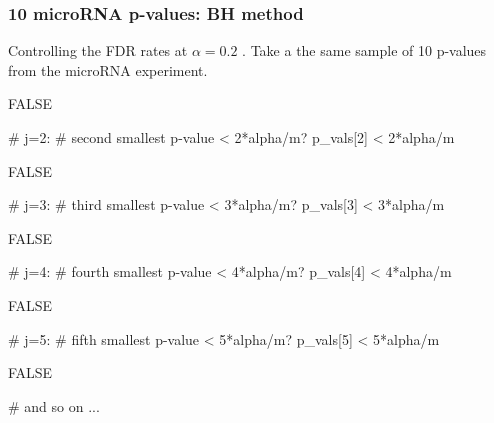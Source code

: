 \documentclass[a4paper]{article}\usepackage[]{graphicx}\usepackage[]{xcolor}
\begin{document}
\subsubsection{10 microRNA p-values: BH method}
Controlling the FDR rates at \( \alpha = 0.2 \) . Take a the same sample of 10 p-values from the microRNA experiment.
\begin{Schunk}
\begin{Soutput}
[1] FALSE
\end{Soutput}
\begin{Sinput}
# j=2: 
# second smallest p-value < 2*alpha/m?
p_vals[2] < 2*alpha/m
\end{Sinput}
\begin{Soutput}
[1] FALSE
\end{Soutput}
\begin{Sinput}
# j=3: 
# third smallest p-value < 3*alpha/m?
p_vals[3] < 3*alpha/m
\end{Sinput}
\begin{Soutput}
[1] FALSE
\end{Soutput}
\begin{Sinput}
# j=4: 
# fourth smallest p-value < 4*alpha/m?
p_vals[4] < 4*alpha/m
\end{Sinput}
\begin{Soutput}
[1] FALSE
\end{Soutput}
\begin{Sinput}
# j=5: 
# fifth smallest p-value < 5*alpha/m?
p_vals[5] < 5*alpha/m
\end{Sinput}
\begin{Soutput}
[1] FALSE
\end{Soutput}
\begin{Sinput}
# and so on ...
\end{Sinput}
\end{Schunk}
\end{document}
